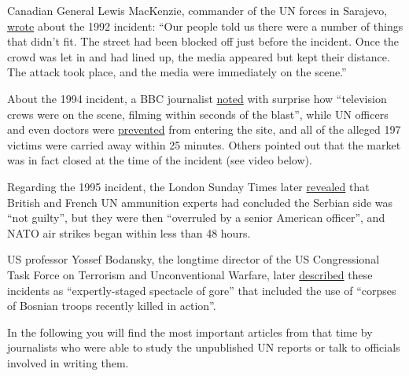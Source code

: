 Canadian General Lewis MacKenzie, commander of the UN forces in
Sarajevo,
\href{https://archive.org/details/peacekeeperroadt0000mack/page/194}{wrote}
about the 1992 incident: ``Our people told us there were a number of
things that didn't fit. The street had been blocked off just before the
incident. Once the crowd was let in and had lined up, the media appeared
but kept their distance. The attack took place, and the media were
immediately on the scene.''

About the 1994 incident, a BBC journalist
\href{http://news.bbc.co.uk/2/hi/europe/3459965.stm}{noted} with
surprise how ``television crews were on the scene, filming within
seconds of the blast'', while UN officers and even doctors were
\href{https://swprs.files.wordpress.com/2019/12/dpa_un-report-sarajevo_1996.pdf}{prevented}
from entering the site, and all of the alleged 197 victims were carried
away within 25 minutes. Others pointed out that the market was in fact
closed at the time of the incident (see video below).

Regarding the 1995 incident, the London Sunday Times later
\href{https://swprs.files.wordpress.com/2019/12/sunday-times_serbs-not-guilty-of-massacre_1995.pdf}{revealed}
that British and French UN ammunition experts had concluded the Serbian
side was ``not guilty'', but they were then ``overruled by a senior
American officer'', and NATO air strikes began within less than 48
hours.

US professor Yossef Bodansky, the longtime director of the US
Congressional Task Force on Terrorism and Unconventional Warfare, later
\href{https://swprs.files.wordpress.com/2019/12/bodansky_offensive-in-the-balkans_1995.pdf\#page=40}{described}
these incidents as ``expertly-staged spectacle of gore'' that included
the use of ``corpses of Bosnian troops recently killed in action''.

In the following you will find the most important articles from that
time by journalists who were able to study the unpublished UN reports or
talk to officials involved in writing them.

